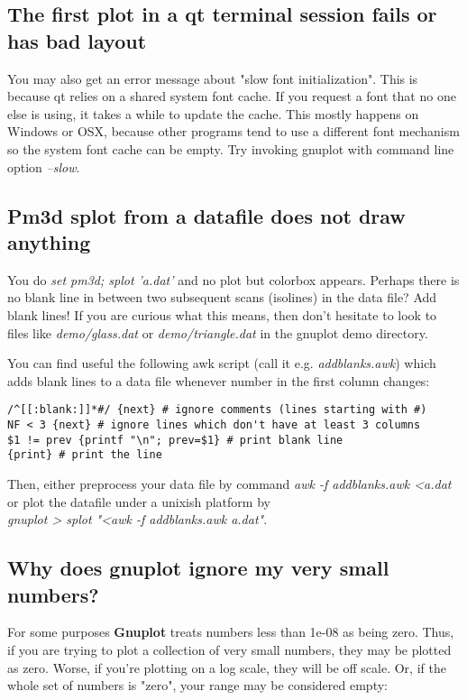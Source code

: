 \documentclass[a4paper,11pt]{article}
\newcommand{\gnuplot}{\textbf{gnuplot }}
\newcommand{\Gnuplot}{\textbf{Gnuplot }}
\begin{document}
\subsection{The first plot in a qt terminal session fails or has bad layout}

You may also get an error message about "slow font initialization".
This is because qt relies on a shared system font cache.
If you request a font that no one else is using, it takes a while to
update the cache.  This mostly happens on Windows or OSX, because other
programs tend to use a different font mechanism so the system font
cache can be empty.
Try invoking gnuplot with command line option {\em --slow}.

\subsection{Pm3d splot from a datafile does not draw anything}

You do {\em set pm3d; splot 'a.dat'} and no plot but colorbox appears.
Perhaps there is no blank line in between two subsequent scans (isolines) in
the data file? Add blank lines! If you are curious what this means, then don't
hesitate to look to files like {\em demo/glass.dat} or {\em demo/triangle.dat}
in the gnuplot demo directory.

You can find useful the following awk script (call it e.g. {\em addblanks.awk})
which adds blank lines to a data file whenever number in the first column
changes:
\small
\begin{verbatim}
/^[[:blank:]]*#/ {next} # ignore comments (lines starting with #)
NF < 3 {next} # ignore lines which don't have at least 3 columns
$1 != prev {printf "\n"; prev=$1} # print blank line
{print} # print the line
\end{verbatim}
\normalsize

Then, either preprocess your data file by command
{\em awk -f addblanks.awk <a.dat}
or plot the datafile under a unixish platform by\\
{\em gnuplot > splot "<awk -f addblanks.awk a.dat"}.

\subsection{Why does \gnuplot ignore my very small numbers?}

For some purposes \Gnuplot{} treats numbers less than 1e-08 as being zero.
Thus, if you are trying to plot a collection of very small
numbers, they may be plotted as zero. Worse, if you're plotting
on a log scale, they will be off scale. Or, if the whole set of
numbers is "zero", your range may be considered empty:
\end{document}
